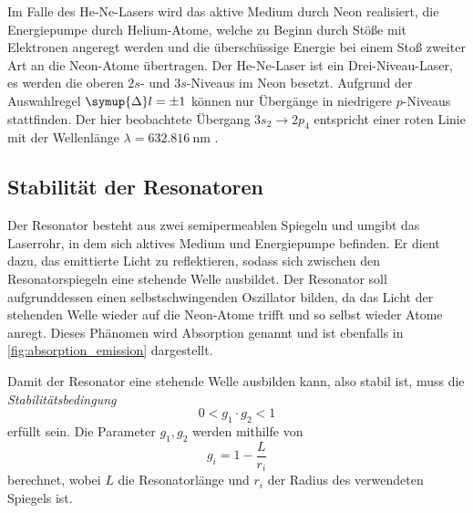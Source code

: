     Im Falle des He-Ne-Lasers wird das aktive Medium durch Neon realisiert,
    die Energiepumpe durch Helium-Atome,
    welche zu Beginn durch Stöße mit Elektronen angeregt werden und die überschüssige Energie bei einem Stoß zweiter Art an die Neon-Atome übertragen.
    Der He-Ne-Laser ist ein Drei-Niveau-Laser,
    es werden die oberen $2s$- und $3s$-Niveaus im Neon besetzt.
    Aufgrund der Auswahlregel $\symup{\Delta} l = \pm 1$ können nur Übergänge in niedrigere $p$-Niveaus stattfinden.
    Der hier beobachtete Übergang $3s_2 \to 2p_4$ entspricht einer roten Linie mit der Wellenlänge $\lambda = \SI{632.816}{\nano\meter}$ \cite{demtroeder}.

\subsection{Stabilität der Resonatoren}
\label{sec:stabilitaet}

    Der Resonator besteht aus zwei semipermeablen Spiegeln und umgibt das Laserrohr,
    in dem sich aktives Medium und Energiepumpe befinden.
    Er dient dazu,
    das emittierte Licht zu reflektieren,
    sodass sich zwischen den Resonatorspiegeln eine stehende Welle ausbildet.
    Der Resonator soll aufgrunddessen einen selbstschwingenden Oszillator bilden,
    da das Licht der stehenden Welle wieder auf die Neon-Atome trifft und so selbst wieder Atome anregt.
    Dieses Phänomen wird Absorption genannt und ist ebenfalls in \autoref{fig:absorption_emission} dargestellt.

    Damit der Resonator eine stehende Welle ausbilden kann,
    also stabil ist,
    muss die \textit{Stabilitätsbedingung}
    \begin{equation}
        0 < g_1 \cdot g_2 < 1
        \label{eqn:stabilitaetsbedingung}
    \end{equation}
    erfüllt sein.
    Die Parameter $g_1, g_2$ werden mithilfe von
    \begin{equation}
        g_i = 1 - \frac{L}{r_i}
        \label{eqn:stabilitaetsparameter}
    \end{equation}
    berechnet,
    wobei $L$ die Resonatorlänge und $r_i$ der Radius des verwendeten Spiegels ist.

